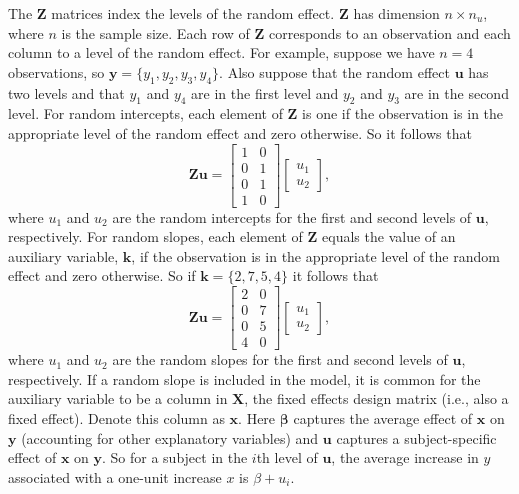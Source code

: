 \documentclass{article}
\begin{document}
The \(\mathbf{Z}\) matrices index the levels of the random effect.
\(\mathbf{Z}\) has dimension \(n \times n_u\), where \(n\) is the sample
size. Each row of \(\mathbf{Z}\) corresponds to an observation and each
column to a level of the random effect. For example, suppose we have
\(n = 4\) observations, so \(\mathbf{y} = \{y_1, y_2, y_3, y_4\}\). Also
suppose that the random effect \(\mathbf{u}\) has two levels and that
\(y_1\) and \(y_4\) are in the first level and \(y_2\) and \(y_3\) are
in the second level. For random intercepts, each element of
\(\mathbf{Z}\) is one if the observation is in the appropriate level of
the random effect and zero otherwise. So it follows that
\begin{equation*}
\mathbf{Z}\mathbf{u} = 
\begin{bmatrix}
1 & 0 \\
0 & 1 \\
0 & 1 \\
1 & 0
\end{bmatrix}
\begin{bmatrix}
u_1 \\
u_2
\end{bmatrix},
\end{equation*} where \(u_1\) and \(u_2\) are the random intercepts for
the first and second levels of \(\mathbf{u}\), respectively. For random
slopes, each element of \(\mathbf{Z}\) equals the value of an auxiliary
variable, \(\mathbf{k}\), if the observation is in the appropriate level
of the random effect and zero otherwise. So if
\(\mathbf{k} = \{2, 7, 5, 4 \}\) it follows that \begin{equation*}
\mathbf{Z}\mathbf{u} = 
\begin{bmatrix}
2 & 0 \\
0 & 7 \\
0 & 5 \\
4 & 0
\end{bmatrix}
\begin{bmatrix}
u_1 \\
u_2
\end{bmatrix},
\end{equation*} where \(u_1\) and \(u_2\) are the random slopes for the
first and second levels of \(\mathbf{u}\), respectively. If a random
slope is included in the model, it is common for the auxiliary variable
to be a column in \(\mathbf{X}\), the fixed effects design matrix (i.e.,
also a fixed effect). Denote this column as \(\mathbf{x}\). Here
\(\boldsymbol{\beta}\) captures the average effect of \(\mathbf{x}\) on
\(\mathbf{y}\) (accounting for other explanatory variables) and
\(\mathbf{u}\) captures a subject-specific effect of \(\mathbf{x}\) on
\(\mathbf{y}\). So for a subject in the \(i\)th level of \(\mathbf{u}\),
the average increase in \(y\) associated with a one-unit increase \(x\)
is \(\beta + u_i\).
\end{document}
